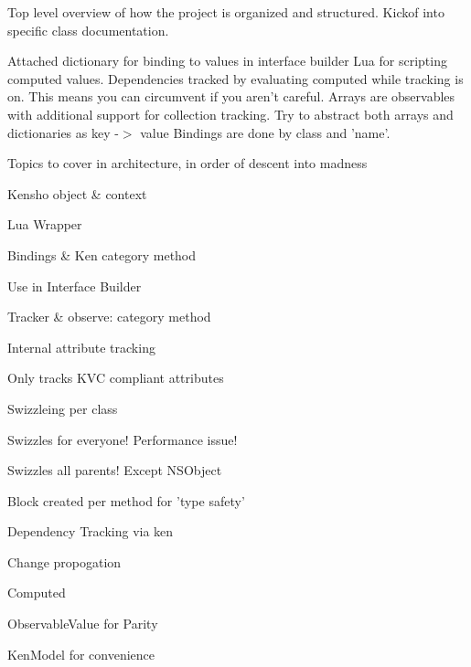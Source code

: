 Top level overview of how the project is organized and structured. Kickof into specific class documentation.

Attached dictionary for binding to values in interface builder Lua for scripting computed values. Dependencies tracked by evaluating computed while tracking is on. This means you can circumvent if you aren't careful. Arrays are observables with additional support for collection tracking. Try to abstract both arrays and dictionaries as key -\/$>$ value Bindings are done by class and 'name'.

Topics to cover in architecture, in order of descent into madness
\begin{DoxyItemize}
\item Kensho object \& context
\item Lua Wrapper
\item Bindings \& Ken category method
\item Use in Interface Builder
\item Tracker \& observe\+: category method
\begin{DoxyItemize}
\item Internal attribute tracking
\begin{DoxyItemize}
\item Only tracks K\+V\+C compliant attributes
\end{DoxyItemize}
\item Swizzleing per class
\begin{DoxyItemize}
\item Swizzles for everyone! Performance issue!
\item Swizzles all parents! Except N\+S\+Object
\item Block created per method for 'type safety'
\end{DoxyItemize}
\item Dependency Tracking via ken
\item Change propogation
\end{DoxyItemize}
\item Computed
\item Observable\+Value for Parity
\item Ken\+Model for convenience 
\end{DoxyItemize}